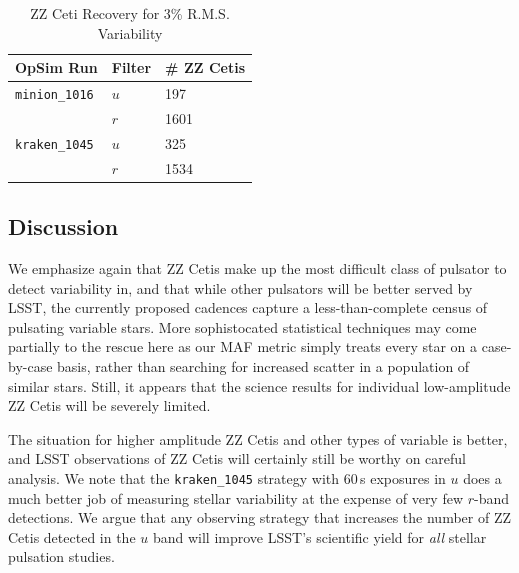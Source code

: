 \begin{table}[h]
\begin{center}
    \caption{ZZ Ceti Recovery for 3\% R.M.S. Variability}\label{tab:zz3pertab}
    \begin{tabular}{| l | l | l |}
    \hline
    OpSim Run & Filter & \# ZZ Cetis \\ \hline
     {\tt minion\_1016} & $u$ & 197  \\
      & $r$ & 1601 \\ \hline
    {\tt kraken\_1045}  & $u$ & 325\\
    & $r$ & 1534  \\ \hline
    \end{tabular}
\end{center}
\end{table}



\subsection{Discussion}
\label{sec:\secname:discussion}

We emphasize again that ZZ Cetis make up the most difficult class of
pulsator to detect variability in, and that while other pulsators will
be better served by LSST, the currently proposed cadences capture a
less-than-complete census of pulsating variable stars.  More
sophistocated statistical techniques may come partially to the rescue
here as our MAF metric simply treats every star on a case-by-case basis,
rather than searching for increased scatter in a population of similar
stars.  Still, it appears that the science results for individual
low-amplitude ZZ Cetis will be severely limited.

The situation for higher amplitude ZZ Cetis and other types of variable
is better, and LSST observations of ZZ Cetis will certainly still be
worthy on careful analysis.  We note that the {\tt kraken\_1045}
strategy with 60\,s exposures in $u$ does a much better job of measuring
stellar variability at the expense of very few $r$-band detections.  We
argue that any observing strategy that increases the number of ZZ Cetis
detected in the $u$ band will improve LSST's scientific yield for
\emph{all} stellar pulsation studies.



\navigationbar
